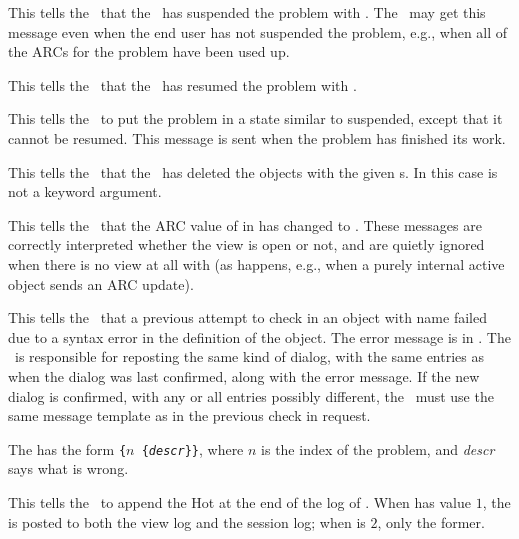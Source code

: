 
This tells the \FE\ that the \SM\ has suspended the problem with
. The \FE\ may get this message even when the end user
has not suspended the problem, e.g., when all of the ARCs for the
problem have been used up.


This tells the \FE\ that the \SM\ has resumed the problem with
.


This tells the \FE\ to put the problem in a state similar to
suspended, except that it cannot be resumed. This message is sent when
the problem has finished its work.


This tells the \FE\ that the \SM\ has deleted the objects with the
given s. In this case  is not a keyword
argument.


This tells the \FE\ that the ARC value of  in
 has changed to . These messages are
correctly interpreted whether the view is open or not, and are quietly
ignored when there is no view at all with  (as happens,
e.g., when a purely internal active object sends an ARC update).


This tells the \FE\ that a previous attempt to check in an object with
name  failed due to a syntax error in the definition of the
object. The error message is in . The \FE\ is
responsible for reposting the same kind of dialog, with the same
entries as when the dialog was last confirmed, along with the error
message. If the new dialog is confirmed, with any or all entries
possibly different, the \FE\ must use the same message template as in
the previous check in request.

The  has the form {\tt\{$n$ \{{\em descr}\}\}}, where
$n$ is the index of the problem, and {\em descr} says what is wrong.



This tells the \FE\ to append the {\sf Hot}  at the end of
the log of . When  has value $1$, the
 is posted to both the view log and the session log; when
 is $2$, only the former.

